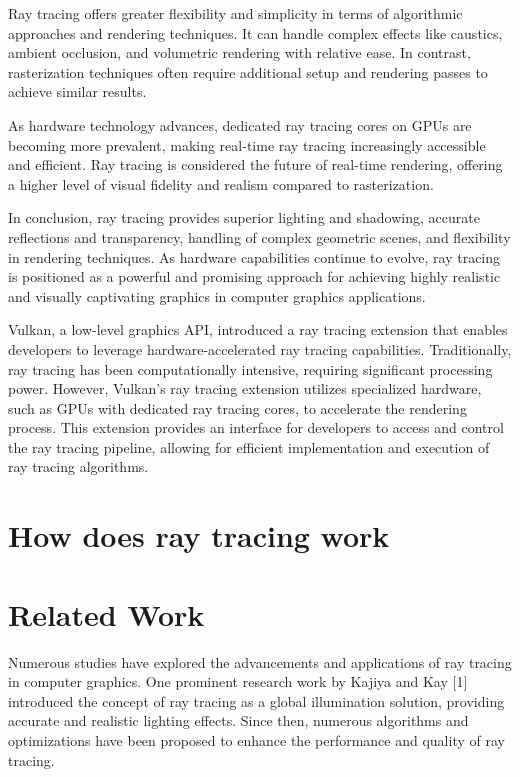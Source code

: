 \documentclass[conference]{IEEEtran}
\begin{document}
Ray tracing offers greater flexibility and simplicity in terms of algorithmic approaches and rendering techniques. It can handle complex effects like caustics, ambient occlusion, and volumetric rendering with relative ease. In contrast, rasterization techniques often require additional setup and rendering passes to achieve similar results.

As hardware technology advances, dedicated ray tracing cores on GPUs are becoming more prevalent, making real-time ray tracing increasingly accessible and efficient. Ray tracing is considered the future of real-time rendering, offering a higher level of visual fidelity and realism compared to rasterization.

In conclusion, ray tracing provides superior lighting and shadowing, accurate reflections and transparency, handling of complex geometric scenes, and flexibility in rendering techniques. As hardware capabilities continue to evolve, ray tracing is positioned as a powerful and promising approach for achieving highly realistic and visually captivating graphics in computer graphics applications.



Vulkan, a low-level graphics API, introduced a ray tracing extension that enables developers to leverage hardware-accelerated ray tracing capabilities. Traditionally, ray tracing has been computationally intensive, requiring significant processing power. However, Vulkan's ray tracing extension utilizes specialized hardware, such as GPUs with dedicated ray tracing cores, to accelerate the rendering process. This extension provides an interface for developers to access and control the ray tracing pipeline, allowing for efficient implementation and execution of ray tracing algorithms.
\section{How does ray tracing work} \label{rt}

\section{Related Work} \label{related-work}
Numerous studies have explored the advancements and applications of ray tracing in computer graphics. One prominent research work by Kajiya and Kay [1] introduced the concept of ray tracing as a global illumination solution, providing accurate and realistic lighting effects. Since then, numerous algorithms and optimizations have been proposed to enhance the performance and quality of ray tracing.
\end{document}
